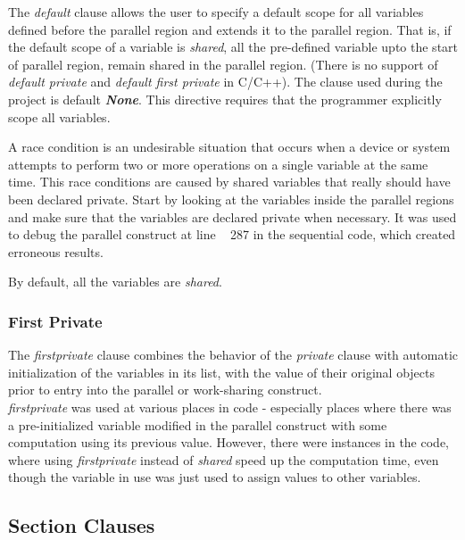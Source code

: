\documentclass[a4paper, 10pt, conference]{IEEEtran}      %
\begin{document}
	The \textit{default} clause allows the user to specify a default scope for all variables defined before the parallel region and extends it to the parallel region. That is, if the default scope of a variable is \textit{shared}, all the pre-defined variable upto the start of parallel region, remain shared in the parallel region. (There is no support of \textit{default private} and \textit{default first private} in C/C++). The clause used during the project is default \textit{\textbf{None}}. This directive requires that the programmer explicitly scope all variables.
	 
	 A race condition is an undesirable situation that occurs when a device or system attempts to perform two or more operations  on a single variable at the same time. This race conditions are caused by shared variables that really should have been declared private. Start by looking at the variables inside the parallel regions and make sure that the variables are declared private when necessary. It was used to debug the parallel construct at line ~ 287 in the sequential code, which created erroneous results.
	 
	 By default, all the variables are \textit{shared}.\\
	 
	\subsubsection{First Private}
	The \textit{firstprivate} clause combines the behavior of the \textit{private} clause with automatic initialization of the variables in its list, with the value of their original objects prior to entry into the parallel or work-sharing construct.\\
	
	\textit{firstprivate} was used at various places in code - especially places where there was a pre-initialized variable modified in the parallel construct with some computation using its previous value. However, there were instances in the code, where using \textit{firstprivate} instead of \textit{shared} speed up the computation time, even though the variable in use was just used to assign values to other variables. \\
	
	\subsection{Section Clauses}
\end{document}
